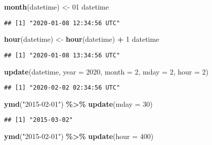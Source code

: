 \documentclass[
]{article}
\newenvironment{Shaded}{\begin{snugshade}}{\end{snugshade}}
\newcommand{\AttributeTok}[1]{\textcolor[rgb]{0.13,0.29,0.53}{#1}}
\newcommand{\DecValTok}[1]{\textcolor[rgb]{0.00,0.00,0.81}{#1}}
\newcommand{\FunctionTok}[1]{\textcolor[rgb]{0.13,0.29,0.53}{\textbf{#1}}}
\newcommand{\NormalTok}[1]{#1}
\newcommand{\OtherTok}[1]{\textcolor[rgb]{0.56,0.35,0.01}{#1}}
\newcommand{\SpecialCharTok}[1]{\textcolor[rgb]{0.81,0.36,0.00}{\textbf{#1}}}
\newcommand{\StringTok}[1]{\textcolor[rgb]{0.31,0.60,0.02}{#1}}
\begin{document}
\begin{Shaded}
\begin{Highlighting}[]
\FunctionTok{month}\NormalTok{(datetime) }\OtherTok{\textless{}{-}} \DecValTok{01}
\NormalTok{datetime}
\end{Highlighting}
\end{Shaded}

\begin{verbatim}
## [1] "2020-01-08 12:34:56 UTC"
\end{verbatim}

\begin{Shaded}
\begin{Highlighting}[]
\FunctionTok{hour}\NormalTok{(datetime) }\OtherTok{\textless{}{-}} \FunctionTok{hour}\NormalTok{(datetime) }\SpecialCharTok{+} \DecValTok{1}
\NormalTok{datetime}
\end{Highlighting}
\end{Shaded}

\begin{verbatim}
## [1] "2020-01-08 13:34:56 UTC"
\end{verbatim}

\begin{Shaded}
\begin{Highlighting}[]
\FunctionTok{update}\NormalTok{(datetime, }\AttributeTok{year =} \DecValTok{2020}\NormalTok{, }\AttributeTok{month =} \DecValTok{2}\NormalTok{, }\AttributeTok{mday =} \DecValTok{2}\NormalTok{, }\AttributeTok{hour =} \DecValTok{2}\NormalTok{)}
\end{Highlighting}
\end{Shaded}

\begin{verbatim}
## [1] "2020-02-02 02:34:56 UTC"
\end{verbatim}

\begin{Shaded}
\begin{Highlighting}[]
\FunctionTok{ymd}\NormalTok{(}\StringTok{"2015{-}02{-}01"}\NormalTok{) }\SpecialCharTok{\%\textgreater{}\%} 
  \FunctionTok{update}\NormalTok{(}\AttributeTok{mday =} \DecValTok{30}\NormalTok{)}
\end{Highlighting}
\end{Shaded}

\begin{verbatim}
## [1] "2015-03-02"
\end{verbatim}

\begin{Shaded}
\begin{Highlighting}[]
\FunctionTok{ymd}\NormalTok{(}\StringTok{"2015{-}02{-}01"}\NormalTok{) }\SpecialCharTok{\%\textgreater{}\%} 
  \FunctionTok{update}\NormalTok{(}\AttributeTok{hour =} \DecValTok{400}\NormalTok{)}
\end{Highlighting}
\end{Shaded}
\end{document}
